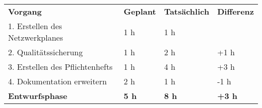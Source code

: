 \begin{tabularx}{\textwidth}{Xlll}
\rowcolor{heading}\textbf{Vorgang} & \textbf{Geplant} & \textbf{Tatsächlich} & \textbf{Differenz} \\
1. Erstellen des Netzwerkplanes & 1 h   & 1 h   &  \\
\rowcolor{odd}2. Qualitätssicherung & 1 h   & 2 h   & +1 h \\
3. Erstellen des Pflichtenhefts & 1 h   & 4 h   & +3 h \\
\rowcolor{odd}4. Dokumentation erweitern & 2 h   & 1 h   & -1 h \\
\hline
\hline
\rowcolor{heading}\textbf{Entwurfsphase} & \textbf{5 h} & \textbf{8 h} & \textbf{+3 h} \\
\end{tabularx}
